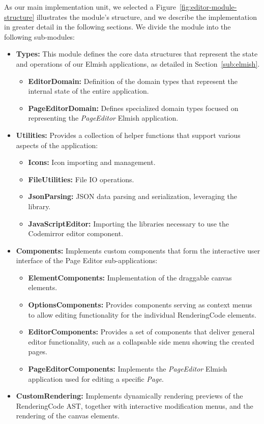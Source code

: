 As our main implementation unit, we selected a
Figure~\ref{fig:editor-module-structure} illustrates the module's structure, and we describe the implementation in greater detail in the following sections.
We divide the module into the following sub-modules:
\begin{itemize}
	\item \textbf{Types:} This module defines the core data structures that represent the state and operations of our Elmish applications, as detailed in Section~\ref{sub:elmish}.
	      \begin{itemize}
		      \item \textbf{EditorDomain:} Definition of the domain types that represent the internal state of the entire application.
		      \item \textbf{PageEditorDomain:} Defines specialized domain types focused on representing the \emph{PageEditor} Elmish application.
	      \end{itemize}

	\item \textbf{Utilities:} Provides a collection of helper functions that support various aspects of the application:
	      \begin{itemize}
		      \item \textbf{Icons:} Icon importing and management.
		      \item \textbf{FileUtilities:} File IO operations.
		      \item \textbf{JsonParsing:} JSON data parsing and serialization, leveraging the \citet{simpleJson} library.
		      \item \textbf{JavaScriptEditor:} Importing the libraries necessary to use the Codemirror editor component.
	      \end{itemize}


	\item \textbf{Components:} Implements custom components that form the interactive user interface of the Page Editor sub-applications:
	      \begin{itemize}
		      \item \textbf{ElementComponents:} Implementation of the draggable canvas elements.
		      \item \textbf{OptionsComponents:} Provides components serving as context menus to allow editing functionality for the individual RenderingCode elements.
		      \item \textbf{EditorComponents:} Provides a set of components that deliver general editor functionality, such as a collapsable side menu showing the created pages.
		      \item \textbf{PageEditorComponents:} Implements the \emph{PageEditor} Elmish application used for editing a specific \emph{Page}.
	      \end{itemize}
	\item \textbf{CustomRendering:} Implements dynamically rendering previews of the RenderingCode AST, together with interactive modification menus, and the rendering of the canvas elements.
\end{itemize}


